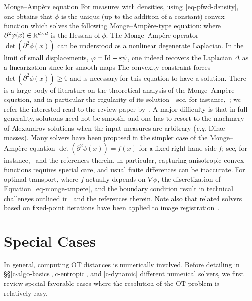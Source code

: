 \begin{rem2}{Monge--Amp\`ere equation}\label{rem:MA}
For measures with densities, using~\eqref{eq-pfwd-density}, one obtains that $\phi$ is the unique (up to the addition of a constant) convex function which solves the following Monge--Amp\`ere-type equation:
where $\partial^2\varphi(x) \in \mathbb{R}^{d \times d}$ is the Hessian of $\phi$. The Monge--Amp\`ere operator $\det(\partial^2\phi(x))$ can be understood as a nonlinear degenerate Laplacian. In the limit of small displacements, $\varphi=\mathrm{Id} + \varepsilon\psi$, one indeed recovers the Laplacian $\Delta$ as a linearization since for smooth maps
%
The convexity constraint forces $\det(\partial^2\phi(x)) \geq 0$ and is necessary for this equation to have a solution.
% 
There is a large body of literature on the theoretical analysis of the Monge--Amp\`ere equation, and in particular the regularity of its solution---see, for instance,~\citep{gutierrez2016monge}; we refer the interested read to the review paper by~\citet{caffarelli2003monge}.
%
A major difficulty is that in full generality, solutions need not be smooth, and one has to resort to the machinery of Alexandrov solutions when the input measures are arbitrary (\emph{e.g.} Dirac masses).
%
Many solvers have been proposed in the simpler case of the Monge--Amp\`ere equation  $\det(\partial^2 \phi(x)) = f(x)$ for a fixed right-hand-side $f$; see, for instance,~\citep{benamou2016monotone} and the references therein. In particular, capturing anisotropic convex functions requires special care, and usual finite differences can be inaccurate.
%
For optimal transport, where $f$ actually depends on $\nabla \phi$, the discretization of Equation~\eqref{eq-monge-ampere}, and the boundary condition result in technical challenges outlined in~\citep{benamou2014numerical} and the references therein.
%
Note also that related solvers based on fixed-point iterations have been applied to image registration~\citep{haker2004optimal}.
\end{rem2}


\section{Special Cases}\label{sec:specialcases}

In general, computing OT distances is numerically involved. Before detailing in \S\S \ref{c-algo-basics},\ref{c-entropic}, and \ref{c-dynamic} different numerical solvers, we first review special favorable cases where the resolution of the OT problem is relatively easy.


